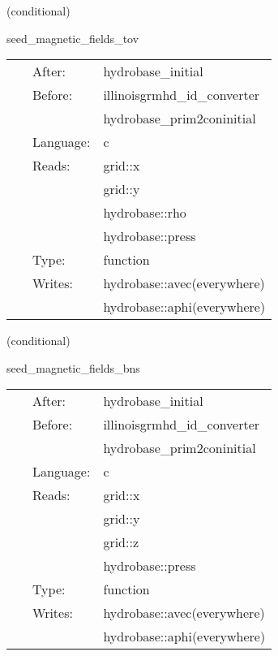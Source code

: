 \documentclass{article}
\begin{document}
   (conditional) 

\hspace{5mm} seed\_magnetic\_fields\_tov 

\hspace{5mm}{\it set up tov seed magnetic fields. } 


\hspace{5mm}

 \begin{tabular*}{160mm}{cll} 
~ & After:  & hydrobase\_initial \\ 
~ & Before:  & illinoisgrmhd\_id\_converter \\ 
~& ~ &hydrobase\_prim2coninitial\\ 
~ & Language:  & c \\ 
~ & Reads:  & grid::x \\ 
~& ~ &grid::y\\ 
~& ~ &hydrobase::rho\\ 
~& ~ &hydrobase::press\\ 
~ & Type:  & function \\ 
~ & Writes:  & hydrobase::avec(everywhere) \\ 
~& ~ &hydrobase::aphi(everywhere)\\ 
\end{tabular*} 


\vspace{5mm}

   (conditional) 

\hspace{5mm} seed\_magnetic\_fields\_bns 

\hspace{5mm}{\it set up binary neutron star seed magnetic fields. } 


\hspace{5mm}

 \begin{tabular*}{160mm}{cll} 
~ & After:  & hydrobase\_initial \\ 
~ & Before:  & illinoisgrmhd\_id\_converter \\ 
~& ~ &hydrobase\_prim2coninitial\\ 
~ & Language:  & c \\ 
~ & Reads:  & grid::x \\ 
~& ~ &grid::y\\ 
~& ~ &grid::z\\ 
~& ~ &hydrobase::press\\ 
~ & Type:  & function \\ 
~ & Writes:  & hydrobase::avec(everywhere) \\ 
~& ~ &hydrobase::aphi(everywhere)\\ 
\end{tabular*} 
\end{document}
